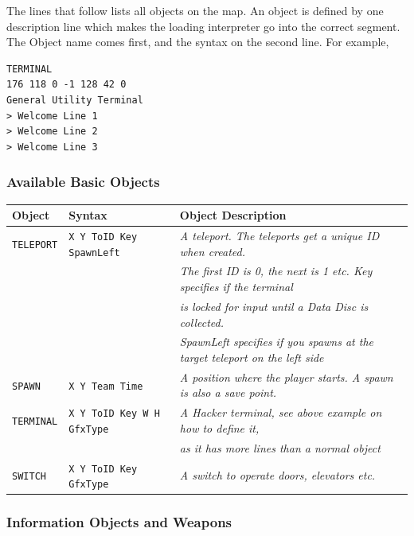 \documentclass[a5paper, 10pt, titlepage, landscape, twoside, final]{article}
\begin{document}
\clearpage
The lines that follow lists all objects on the map. An object is defined by one description line which makes the loading interpreter go into the correct segment. The Object name comes first, and the syntax on the second line. For example,
\begin{verbatim}
TERMINAL
176 118 0 -1 128 42 0
General Utility Terminal
> Welcome Line 1
> Welcome Line 2
> Welcome Line 3
\end{verbatim}

\subsubsection{Available Basic Objects}
\begin{table}[ht]
  \small
  \begin{tabular}{lll}
    \textbf{Object} & \textbf{Syntax} & \textbf{Object Description}\\
    \hline
    \hline
    \texttt{TELEPORT} & \texttt{X Y ToID Key SpawnLeft} &
    \textit{A teleport. The teleports get a unique ID when created.}\\
    & & \textit{The first ID is 0, the next is 1 etc. Key specifies if the terminal} \\
    & & \textit{is locked for input until a Data Disc is collected.} \\
    & & \textit{SpawnLeft specifies if you spawns at the target teleport on the left side} \\
    \texttt{SPAWN} & \texttt{X Y Team Time} & \textit{A position where the player starts. A spawn is also a save point.} \\
    \texttt{TERMINAL} & \texttt{X Y ToID Key W H GfxType} & \textit{A Hacker terminal, see above example on how to define it,} \\
    & & \textit{as it has more lines than a normal object} \\
    \texttt{SWITCH} & \texttt{X Y ToID Key GfxType} & \textit{A switch to operate doors, elevators etc.}
  \end{tabular}
\end{table}

\clearpage
\subsubsection{Information Objects and Weapons}
\end{document}
